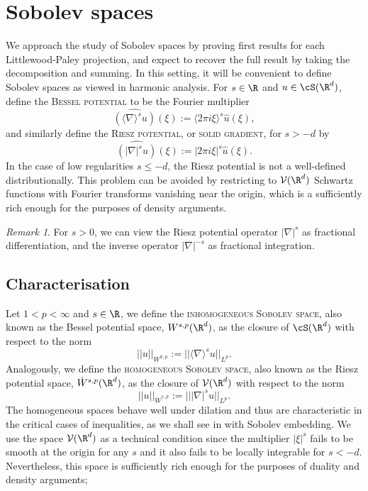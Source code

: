 \documentclass[reqno]{amsart}
\theoremstyle{definition}
\theoremstyle{remark}
\newtheorem*{remark}{Remark}
\newcounter{problem}[section]	\declaretheorem[style=thmrecbox,name=Problem, numberlike=problem]{statement}
\renewcommand{\emph}{\textsc}
\begin{document}
\section{Sobolev spaces}

We approach the study of Sobolev spaces by proving first results for each Littlewood-Paley projection, and expect to recover the full result by taking the decomposition and summing. In this setting, it will be convenient to define Sobolev spaces as viewed in harmonic analysis. For $s \in \R$ and $u \in \cS (\R^d)$, define the \emph{Bessel potential} to be the Fourier multiplier
	\[ \widehat{(\langle \nabla \rangle^s u)} (\xi) := \langle 2\pi i \xi \rangle^s \widehat u (\xi),  \]
and similarly define the \emph{Riesz potential}, or \emph{solid gradient}, for $s > -d$ by
	\[ \widehat{(|\nabla|^s u)} (\xi) := |2\pi i \xi|^s \widehat u(\xi).  \]	
In the case of low regularities $s \leq -d$, the Riesz potential is not a well-defined distributionally. This problem can be avoided by restricting to $\mathcal V (\R^d)$ Schwartz functions with Fourier transforms vanishing near the origin, which is a sufficiently rich enough for the purposes of density arguments. 

\begin{remark}
For $s > 0$, we can view the Riesz potential operator $|\nabla|^s$ as fractional differentiation, and the inverse operator $|\nabla|^{-s}$ as fractional integration.
\end{remark}

\subsection{Characterisation} 

Let $1 < p < \infty$ and $s \in \R$, we define the \emph{inhomogeneous Sobolev space}, also known as the Bessel potential space, $W^{s, p} (\R^d)$, as the closure of $\cS (\R^d)$ with respect to the norm 
	\[ ||u||_{W^{k, p}} := ||\langle \nabla \rangle^s u||_{L^p}. \]
Analogously, we define the \emph{homogeneous Sobolev space}, also known as the Riesz potential space, $\dot W^{s, p} (\R^d)$, as the closure of $\mathcal V (\R^d)$ with respect to the norm 
	\[ ||u||_{\dot W^{s, p}} := |||\nabla|^s u||_{L^p}. \]
The homogeneous spaces behave well under dilation and thus are characteristic in the critical cases of inequalities, as we shall see in with Sobolev embedding. We use the space $\mathcal V (\R^d)$ as a technical condition since the multiplier $|\xi|^s$ fails to be smooth at the origin for any $s$ and it also fails to be locally integrable for $s < -d$. Nevertheless, this space is sufficiently rich enough for the purposes of duality and density arguments;
\end{document}
